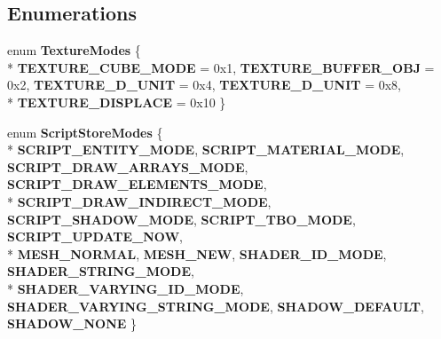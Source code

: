 \subsection*{Enumerations}
\begin{DoxyCompactItemize}
\item 
\hypertarget{namespaceEngine_a3f978ab8dcfda71a7b515522591cc8a2}{}enum {\bfseries Texture\+Modes} \{ \\*
{\bfseries T\+E\+X\+T\+U\+R\+E\+\_\+\+C\+U\+B\+E\+\_\+\+M\+O\+D\+E} = 0x1, 
{\bfseries T\+E\+X\+T\+U\+R\+E\+\_\+\+B\+U\+F\+F\+E\+R\+\_\+\+O\+B\+J} = 0x2, 
{\bfseries T\+E\+X\+T\+U\+R\+E\+\_\+D\+\_\+\+U\+N\+I\+T} = 0x4, 
{\bfseries T\+E\+X\+T\+U\+R\+E\+\_\+D\+\_\+\+U\+N\+I\+T} = 0x8, 
\\*
{\bfseries T\+E\+X\+T\+U\+R\+E\+\_\+\+D\+I\+S\+P\+L\+A\+C\+E} = 0x10
 \}\label{namespaceEngine_a3f978ab8dcfda71a7b515522591cc8a2}

\item 
\hypertarget{namespaceEngine_af851bba1a058262cb03871a360b9b044}{}enum {\bfseries Script\+Store\+Modes} \{ \\*
{\bfseries S\+C\+R\+I\+P\+T\+\_\+\+E\+N\+T\+I\+T\+Y\+\_\+\+M\+O\+D\+E}, 
{\bfseries S\+C\+R\+I\+P\+T\+\_\+\+M\+A\+T\+E\+R\+I\+A\+L\+\_\+\+M\+O\+D\+E}, 
{\bfseries S\+C\+R\+I\+P\+T\+\_\+\+D\+R\+A\+W\+\_\+\+A\+R\+R\+A\+Y\+S\+\_\+\+M\+O\+D\+E}, 
{\bfseries S\+C\+R\+I\+P\+T\+\_\+\+D\+R\+A\+W\+\_\+\+E\+L\+E\+M\+E\+N\+T\+S\+\_\+\+M\+O\+D\+E}, 
\\*
{\bfseries S\+C\+R\+I\+P\+T\+\_\+\+D\+R\+A\+W\+\_\+\+I\+N\+D\+I\+R\+E\+C\+T\+\_\+\+M\+O\+D\+E}, 
{\bfseries S\+C\+R\+I\+P\+T\+\_\+\+S\+H\+A\+D\+O\+W\+\_\+\+M\+O\+D\+E}, 
{\bfseries S\+C\+R\+I\+P\+T\+\_\+\+T\+B\+O\+\_\+\+M\+O\+D\+E}, 
{\bfseries S\+C\+R\+I\+P\+T\+\_\+\+U\+P\+D\+A\+T\+E\+\_\+\+N\+O\+W}, 
\\*
{\bfseries M\+E\+S\+H\+\_\+\+N\+O\+R\+M\+A\+L}, 
{\bfseries M\+E\+S\+H\+\_\+\+N\+E\+W}, 
{\bfseries S\+H\+A\+D\+E\+R\+\_\+\+I\+D\+\_\+\+M\+O\+D\+E}, 
{\bfseries S\+H\+A\+D\+E\+R\+\_\+\+S\+T\+R\+I\+N\+G\+\_\+\+M\+O\+D\+E}, 
\\*
{\bfseries S\+H\+A\+D\+E\+R\+\_\+\+V\+A\+R\+Y\+I\+N\+G\+\_\+\+I\+D\+\_\+\+M\+O\+D\+E}, 
{\bfseries S\+H\+A\+D\+E\+R\+\_\+\+V\+A\+R\+Y\+I\+N\+G\+\_\+\+S\+T\+R\+I\+N\+G\+\_\+\+M\+O\+D\+E}, 
{\bfseries S\+H\+A\+D\+O\+W\+\_\+\+D\+E\+F\+A\+U\+L\+T}, 
{\bfseries S\+H\+A\+D\+O\+W\+\_\+\+N\+O\+N\+E}
 \}\label{namespaceEngine_af851bba1a058262cb03871a360b9b044}


\end{DoxyCompactItemize}
